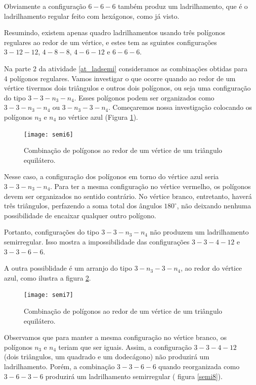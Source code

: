 Obviamente a configuração $6-6-6$ também produz um ladrilhamento, que é o ladrilhamento regular feito com hexágonos, como já visto.

Resumindo, existem apenas quadro ladrilhamentos usando três polígonos regulares
ao redor de um vértice, e estes tem as sguintes configurações  $3-12-12$, $4-8-8$,  $4-6-12$  e $6-6-6$.

Na parte 2 da atividade \ref{at_ladsemi} consideramos as combinações obtidas para 4 polígonos regulares. 
Vamos investigar o que ocorre quando ao redor de um vértice tivermos  dois triângulos e outros dois polígonos, ou seja uma configuração do tipo $3-3-n_3-n_4$. Esses polígonos podem ser organizados como $3-3-n_3-n_4$ ou $3-n_3-3-n_4$. 
Começaremos nossa investigação colocando os polígonos $n_3$ e $n_4$ no vértice azul (Figura \ref{semi6}). 


\begin{figure}[H]
\centering
\texttt{[image: semi6]}
\label{semi6}
\caption{Combinação de polígonos ao redor de um vértice de um triângulo equilátero.}
\end{figure}


Nesse caso, a configuração dos polígonos em torno do vértice azul seria $3-3-n_3-n_4$. Para ter a mesma configuração no vértice vermelho, os polígonos devem ser organizados no sentido contrário. No vértice branco, entretanto, haverá três triângulos, perfazendo a soma total dos ângulos $180^{\circ}$, não deixando nenhuma possibilidade de encaixar qualquer outro polígono. 

Portanto, configurações do tipo $3-3-n_3-n_4$ não produzem um ladrilhamento semirregular. Isso mostra a impossibilidade das configurações $3-3-4-12$ e $3-3-6-6$.

A outra possiblidade é um  arranjo do tipo $3-n_3-3-n_4$, ao redor do vértice azul, como ilustra a figura \ref{semi7}.



\begin{figure}[H]
\centering
\texttt{[image: semi7]}
\label{semi7}
\caption{Combinação de polígonos ao redor de um vértice de um triângulo equilátero.}
\end{figure}

Observamos que para manter a mesma configuração no vértice branco, os polígonos $n_3$  e $n_4$ teriam que ser iguais. Assim, a configuração $3-3-4-12$ (dois triângulos, um quadrado e um dodecágono) não produzirá um ladrilhamento. Porém, a combinação $3-3-6-6$ quando reorganizada como $3-6-3-6$ produzirá um ladrilhamento semirregular ( figura \ref{semi8}).




